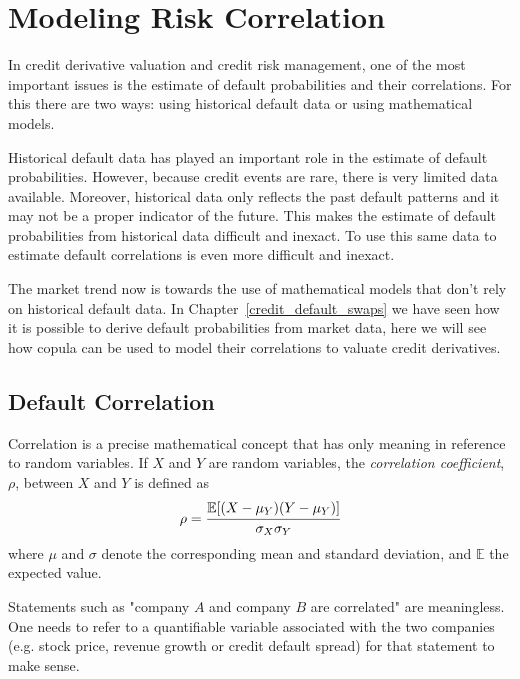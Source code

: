 \chapter{Modeling Risk Correlation}

In credit derivative valuation and credit risk management, one of the most important issues is the estimate of default probabilities and their correlations. For this there are two ways: using historical default data or using mathematical models.

Historical default data has played an important role in the estimate of default probabilities. However, because credit events are rare, there is very limited data available. Moreover, historical data only reflects the past default patterns and it may not be a proper indicator of the future. This makes the estimate of default probabilities from historical data difficult and inexact. To use this same data to estimate default correlations is even more difficult and inexact.

The market trend now is towards the use of mathematical models that don't rely on historical default data. In Chapter~\ref{credit_default_swaps} we have seen how it is possible to derive default probabilities from market data, here we will see how copula can be used to model their correlations to valuate credit derivatives. 

\section{Default Correlation}\label{sec:default_correlation}
Correlation is a precise mathematical concept that has only meaning in reference to random variables. If $X$ and $Y$ are random variables, the \emph{correlation coefficient}, $\rho$, between $X$ and $Y$ is defined as
\begin{equation}
\rho = \cfrac{\mathbb{E}[(X-\mu_Y)(Y-\mu_Y)]}{\sigma_X \sigma_Y}
\label{eq:correlation_coefficient}
\end{equation}
where $\mu$ and $\sigma$ denote the corresponding mean and standard deviation, and $\mathbb{E}$ the expected value.

Statements such as "company $A$ and company $B$ are correlated" are meaningless. One needs to refer to a quantifiable variable associated with the two companies (e.g. stock price, revenue growth or credit default spread) for that statement to make sense.

